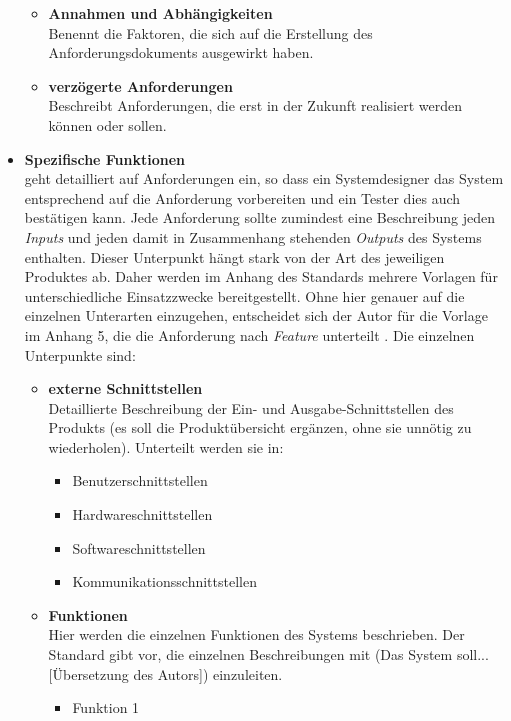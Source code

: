 \begin{itemize}
\begin{itemize}
		\item \textbf{Annahmen und Abhängigkeiten} \\
		Benennt die Faktoren, die sich auf die Erstellung des Anforderungsdokuments ausgewirkt haben.
		\item \textbf{verzögerte Anforderungen} \\
		Beschreibt Anforderungen, die erst in der Zukunft realisiert werden können oder sollen.
	\end{itemize}
	\item \textbf{Spezifische Funktionen} \citep[vgl.][S. 15 - 20]{ieee1998}\\
	geht detailliert auf Anforderungen ein, so dass ein Systemdesigner das System entsprechend auf die Anforderung vorbereiten und ein Tester dies auch bestätigen kann. 
	Jede Anforderung sollte zumindest eine Beschreibung jeden \textit{Inputs} und jeden damit in Zusammenhang stehenden \textit{Outputs} des Systems enthalten. Dieser Unterpunkt hängt stark von der Art des jeweiligen Produktes ab. Daher werden im Anhang des Standards mehrere Vorlagen für unterschiedliche Einsatzzwecke bereitgestellt. Ohne hier genauer auf die einzelnen Unterarten einzugehen, entscheidet sich der Autor für die Vorlage im Anhang 5, die die Anforderung nach \textit{Feature} unterteilt \citep[vgl.][23]{ieee1998}. Die einzelnen Unterpunkte sind:
	\begin{itemize}
		\item \textbf{externe Schnittstellen} \\
		Detaillierte Beschreibung der Ein- und Ausgabe-Schnittstellen des Produkts (es soll die Produktübersicht ergänzen, ohne sie unnötig zu wiederholen). Unterteilt werden sie in:
		\begin{itemize}
			\item Benutzerschnittstellen
			\item Hardwareschnittstellen
			\item Softwareschnittstellen
			\item Kommunikationsschnittstellen
		\end{itemize}
		\item \textbf{Funktionen} \\
		Hier werden die einzelnen Funktionen des Systems beschrieben. Der Standard gibt vor, die einzelnen Beschreibungen mit (Das System soll... [Übersetzung des Autors]) \citep[][16]{ieee1998} einzuleiten.
		\begin{itemize}
			\item Funktion 1

\end{itemize}
\end{itemize}
\end{itemize}
